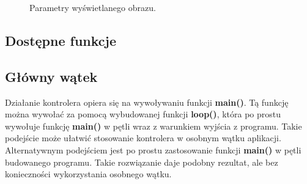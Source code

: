 \begin{figure}[H]
    \centering
    \hfill
    \caption{Parametry wyświetlanego obrazu.}
\end{figure}

\subsection{Dostępne funkcje}

\subsection{Główny wątek}
\quad Działanie kontrolera opiera się na wywoływaniu funkcji \textbf{main()}. Tą funkcję można wywołać za pomocą wybudowanej funkcji \textbf{loop()}, która po prostu wywołuje funkcję \textbf{main()} w pętli wraz z warunkiem wyjścia z programu. Takie podejście może ułatwić stosowanie kontrolera w osobnym wątku aplikacji. 
\quad Alternatywnym podejściem jest po prostu zastosowanie funkcji \textbf{main()} w pętli budowanego programu. Takie rozwiązanie daje podobny rezultat, ale bez konieczności wykorzystania osobnego wątku. 

